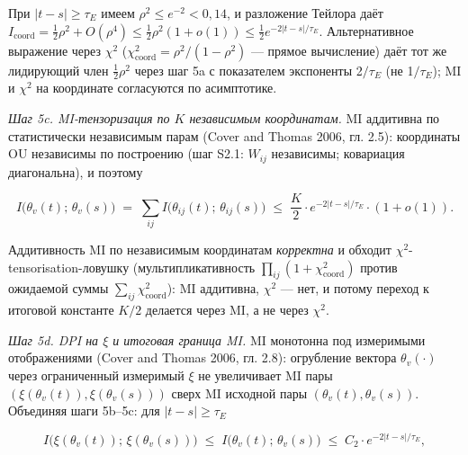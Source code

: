 \documentclass[pdflatex,sn-mathphys-ay]{sn-jnl}
\begin{document}
При \(|t-s| \ge \tau_E\) имеем \(\rho^2 \le e^{-2} < 0{,}14\), и разложение Тейлора даёт \(I_{\text{coord}} = \tfrac{1}{2}\rho^2 + O(\rho^4) \le \tfrac{1}{2}\rho^2(1 + o(1)) \le \tfrac{1}{2} e^{-2|t-s|/\tau_E}\). Альтернативное выражение через \(\chi^2\) (\(\chi^2_{\text{coord}} = \rho^2/(1-\rho^2)\) --- прямое вычисление) даёт тот же лидирующий член \(\tfrac{1}{2}\rho^2\) через шаг 5a с показателем экспоненты 2\(/\tau_E\) (не 1\(/\tau_E\)); MI и \(\chi^2\) на координате согласуются по асимптотике.



\emph{Шаг 5c. MI-тензоризация по \(K\) независимым координатам.} MI аддитивна по статистически независимым парам (Cover and Thomas 2006, гл. 2.5): координаты OU независимы по построению (шаг S2.1: \(W_{ij}\) независимы; ковариация диагональна), и поэтому



\begin{equation}I\bigl(\theta_v(t);\, \theta_v(s)\bigr) \;=\; \sum_{ij} I\bigl(\theta_{ij}(t);\, \theta_{ij}(s)\bigr) \;\le\; \frac{K}{2} \cdot e^{-2|t-s|/\tau_E} \cdot (1 + o(1)). \tag{S1.5b}\end{equation}



Аддитивность MI по независимым координатам \emph{корректна} и обходит \(\chi^2\)-tensorisation-ловушку (мультипликативность \(\prod_{ij}(1 + \chi^2_{\text{coord}})\) против ожидаемой суммы \(\sum_{ij} \chi^2_{\text{coord}}\)): MI аддитивна, \(\chi^2\) --- нет, и потому переход к итоговой константе \(K/2\) делается через MI, а не через \(\chi^2\).



\emph{Шаг 5d. DPI на \(\xi\) и итоговая граница MI.} MI монотонна под измеримыми отображениями (Cover and Thomas 2006, гл. 2.8): огрубление вектора \(\theta_v(\cdot)\) через ограниченный измеримый \(\xi\) не увеличивает MI пары \((\xi(\theta_v(t)), \xi(\theta_v(s)))\) сверх MI исходной пары \((\theta_v(t), \theta_v(s))\). Объединяя шаги 5b--5c: для \(|t-s| \ge \tau_E\)



\begin{equation}I\bigl(\xi(\theta_v(t));\, \xi(\theta_v(s))\bigr) \;\le\; I\bigl(\theta_v(t);\, \theta_v(s)\bigr) \;\le\; C_2 \cdot e^{-2|t-s|/\tau_E}, \tag{S1.5}\end{equation}
\end{document}
